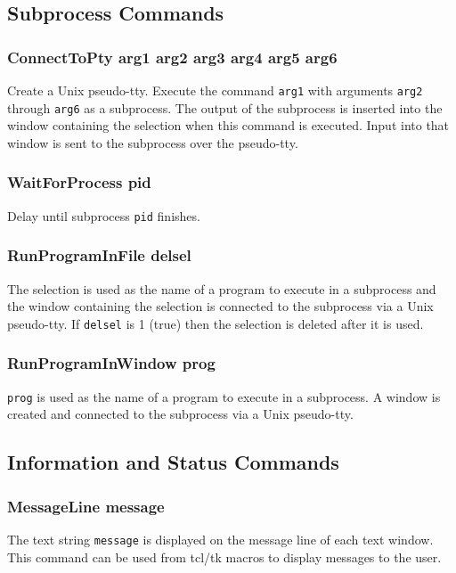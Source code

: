 \subsection{ Subprocess Commands }

\subsubsection{ConnectToPty arg1 arg2 arg3 arg4 arg5 arg6}
Create a Unix pseudo-tty.
Execute the command {\tt arg1} with arguments {\tt arg2} through
{\tt arg6} as a subprocess.
The output of the subprocess is inserted into the window
containing the selection when this command is executed.
Input into that window is sent to the subprocess over
the pseudo-tty.

\subsubsection{WaitForProcess pid}
Delay until subprocess {\tt pid} finishes.

\subsubsection{RunProgramInFile delsel}
The selection is used as the name of a program to execute
in a subprocess and the window containing the selection is connected
to the subprocess via a Unix pseudo-tty.
If {\tt delsel} is 1 (true) then the selection is deleted
after it is used.

\subsubsection{RunProgramInWindow prog}
{\tt prog} is used as the name of a program to execute
in a subprocess.
A window is created and connected to the subprocess via a Unix pseudo-tty.





\subsection{ Information and Status Commands }

\subsubsection{MessageLine message}
The text string {\tt message} is displayed on the message line of
each text window.
This command can be used from tcl/tk macros to display messages
to the user.

